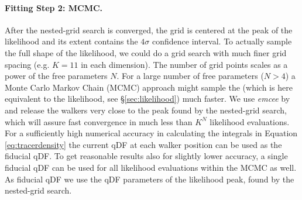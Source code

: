 \paragraph{Fitting Step 2: MCMC.} After the nested-grid search is converged, the grid is centered at the peak of the likelihood and its extent contains the $4\sigma$ confidence interval. To actually sample the full shape of the likelihood, we could do a grid search with much finer grid spacing (e.g. $K=11$ in each dimension). The number of grid points scales as a power of the free parameters $N$. For a large number of free parameters ($N>4$) a Monte Carlo Markov Chain (MCMC) approach might sample the \pdf{} (which is here equivalent to the likelihood, see \S \ref{sec:likelihood}) much faster. We use \emph{emcee} by \citet{for13} and release the walkers very close to the \pdf{} peak found by the nested-grid search, which will assure fast convergence in much less than $K^N$ likelihood evaluations.
\\For a sufficiently high numerical accuracy in calculating the integrals in Equation \ref{eq:tracerdensity} the current qDF at each walker position can be used as the fiducial qDF. To get reasonable results also for slightly lower accuracy, a single fiducial qDF can be used for all likelihood evaluations within the MCMC as well. As fiducial qDF we use the qDF parameters of the likelihood peak, found by the nested-grid search.

